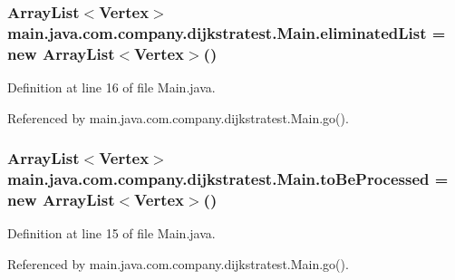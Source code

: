 \hypertarget{classmain_1_1java_1_1com_1_1company_1_1dijkstratest_1_1_main_af031de92d898217502e31dcd4d6c9539}{
\subsubsection[{eliminated\-List}]{\setlength{\rightskip}{0pt plus 5cm}Array\-List$<${\bf Vertex}$>$ main.\-java.\-com.\-company.\-dijkstratest.\-Main.\-eliminated\-List = new Array\-List$<${\bf Vertex}$>$()\hspace{0.3cm}{\ttfamily [private]}}}\label{classmain_1_1java_1_1com_1_1company_1_1dijkstratest_1_1_main_af031de92d898217502e31dcd4d6c9539}


Definition at line 16 of file Main.\-java.



Referenced by main.\-java.\-com.\-company.\-dijkstratest.\-Main.\-go().

\hypertarget{classmain_1_1java_1_1com_1_1company_1_1dijkstratest_1_1_main_a557eccaa4afe7d83cf6cc262d1ba1f3d}{
\subsubsection[{to\-Be\-Processed}]{\setlength{\rightskip}{0pt plus 5cm}Array\-List$<${\bf Vertex}$>$ main.\-java.\-com.\-company.\-dijkstratest.\-Main.\-to\-Be\-Processed = new Array\-List$<${\bf Vertex}$>$()\hspace{0.3cm}{\ttfamily [private]}}}\label{classmain_1_1java_1_1com_1_1company_1_1dijkstratest_1_1_main_a557eccaa4afe7d83cf6cc262d1ba1f3d}


Definition at line 15 of file Main.\-java.



Referenced by main.\-java.\-com.\-company.\-dijkstratest.\-Main.\-go().

